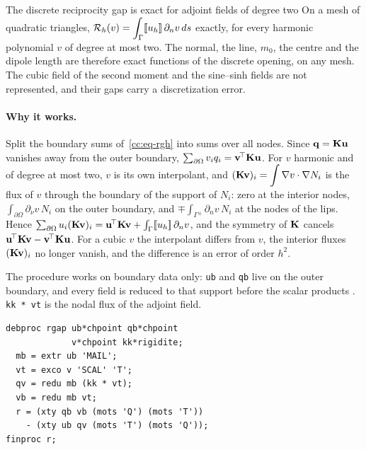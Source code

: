 \begin{gbox}{The discrete reciprocity gap is exact for adjoint fields of degree two}\label{cc:box-rgh}
On a mesh of quadratic triangles, $\displaystyle \mathcal{R}_h(v)=\int_\Gamma[\![u_h]\!]\,\partial_nv\,ds$
exactly, for every harmonic polynomial $v$ of degree at most two. The normal,
the line, $m_0$, the centre and the dipole length are therefore exact functions
of the discrete opening, on any mesh. The cubic field of the second moment and
the sine--sinh fields are not represented, and their gaps carry a
discretization error.
\end{gbox}

\paragraph{Why it works.}
Split the boundary sums of~\eqref{cc:eq-rgh} into sums over all nodes. Since
$\mathbf{q}=\mathbf{K}\mathbf{u}$ vanishes away from the outer boundary,
$\sum_{\partial\Omega}v_iq_i=\mathbf{v}^{\!\top}\mathbf{K}\mathbf{u}$. For $v$ harmonic and of
degree at most two, $v$ is its own interpolant, and
$\displaystyle (\mathbf{K}\mathbf{v})_i=\int\nabla v\cdot\nabla N_i$ is the flux of
$v$ through the boundary of the support of $N_i$: zero at the interior nodes,
$\displaystyle \int_{\partial\Omega}\partial_\nu v\,N_i$ on the outer boundary, and
$\displaystyle \mp\int_{\Gamma^\pm}\partial_nv\,N_i$ at the nodes of the lips. Hence
$\sum_{\partial\Omega}u_i(\mathbf{K}\mathbf{v})_i=\mathbf{u}^{\!\top}\mathbf{K}\mathbf{v}
+\int_{\Gamma}[\![u_h]\!]\,\partial_nv$, and the symmetry of $\mathbf{K}$ cancels
$\mathbf{u}^{\!\top}\mathbf{K}\mathbf{v}-\mathbf{v}^{\!\top}\mathbf{K}\mathbf{u}$. For a cubic $v$ the
interpolant differs from $v$, the interior fluxes $(\mathbf{K}\mathbf{v})_i$ no longer
vanish, and the difference is an error of order $h^2$.

\begin{castemcom}
The procedure works on boundary data only: \texttt{ub} and \texttt{qb} live on
the outer boundary, and every field is reduced to that support before the
scalar products . \texttt{kk * vt} is the nodal flux of the adjoint
field.
\end{castemcom}
\begin{castemlines}
\begin{verbatim}
debproc rgap ub*chpoint qb*chpoint
             v*chpoint kk*rigidite;
  mb = extr ub 'MAIL';
  vt = exco v 'SCAL' 'T';
  qv = redu mb (kk * vt);
  vb = redu mb vt;
  r = (xty qb vb (mots 'Q') (mots 'T'))
    - (xty ub qv (mots 'T') (mots 'Q'));
finproc r;
\end{verbatim}
\end{castemlines}

